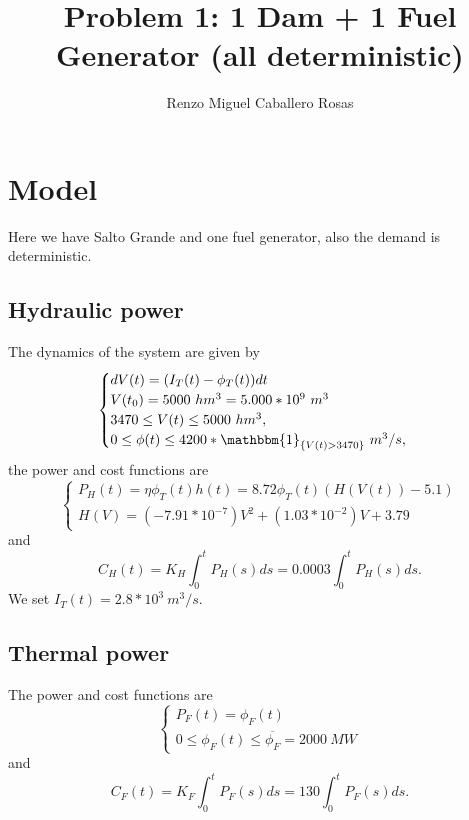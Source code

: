 \documentclass[12pt]{article}
\theoremstyle{definition}
\theoremstyle{remark}
\begin{document}
\title{Problem 1: 1 Dam + 1 Fuel Generator (all deterministic)}
\author{Renzo Miguel Caballero Rosas} 
\maketitle

\pagebreak
\tableofcontents
\pagebreak

\section{Model}

Here we have Salto Grande and one fuel generator, also the demand is deterministic.

\subsection{Hydraulic power}

The dynamics of the system are given by
\begin{equation*}
\begin{cases}
dV(t)=(I_T(t)-\phi_T(t))dt\\
V(t_0)=5000\ hm^3=5.000*10^9\ m^3\\
3470\leq V(t)\leq5000\ hm^3,\\
0\leq\phi(t)\leq4200*\mathbbm{1}_{\{V(t)>3470\}}\ m^3/s,
\end{cases}
\end{equation*}
the power and cost functions are
\begin{equation*}
\begin{cases}
P_H(t)=\eta\phi_T(t)h(t)=8.72\phi_T(t)(H(V(t))-5.1)\\
H(V)=(-7.91*10^{-7})V^2+(1.03*10^{-2})V+3.79
\end{cases}
\end{equation*}
and
\begin{equation*}
C_H(t)=K_H\int_0^tP_H(s)ds=0.0003\int_0^tP_H(s)ds.
\end{equation*}
We set $I_T(t)=2.8*10^3\ m^3/s$.

\subsection{Thermal power}

The power and cost functions are
\begin{equation*}
\begin{cases}
P_F(t)=\phi_F(t)\\
0\leq\phi_F(t)\leq\overline{\phi_F}=2000\ MW
\end{cases}
\end{equation*}
and
\begin{equation*}
C_F(t)=K_F\int_0^tP_F(s)ds=130\int_0^tP_F(s)ds.
\end{equation*}
\end{document}
